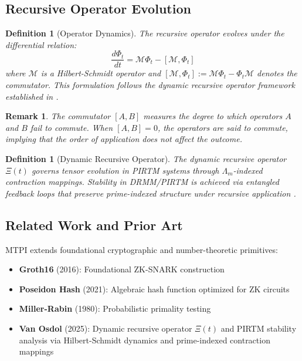 \documentclass[11pt,a4paper]{article}
\newtheorem{definition}[theorem]{Definition}
\newtheorem{remark}[theorem]{Remark}
\newcommand{\Commutator}[2]{[#1, #2]}
\newcommand{\XiOp}{\Xi(t)}
\begin{document}
\subsection{Recursive Operator Evolution}

\begin{definition}[Operator Dynamics]
The recursive operator evolves under the differential relation:
\begin{equation}
    \frac{d\Phi_t}{dt} = \mathcal{M}\Phi_t - \Commutator{\mathcal{M}}{\Phi_t}
    \label{eq:operator_evolution}
\end{equation}
where $\mathcal{M}$ is a Hilbert-Schmidt operator and $\Commutator{\mathcal{M}}{\Phi_t} := \mathcal{M}\Phi_t - \Phi_t\mathcal{M}$ denotes the commutator. This formulation follows the dynamic recursive operator framework established in \cite{vanosdol2025}.
\end{definition}

\begin{remark}
The commutator $\Commutator{A}{B}$ measures the degree to which operators $A$ and $B$ fail to commute. When $\Commutator{A}{B} = 0$, the operators are said to commute, implying that the order of application does not affect the outcome.
\end{remark}

\begin{definition}[Dynamic Recursive Operator]
The dynamic recursive operator $\XiOp$ governs tensor evolution in PIRTM systems through $\Lambda_m$-indexed contraction mappings. Stability in DRMM/PIRTM is achieved via entangled feedback loops that preserve prime-indexed structure under recursive application \cite{vanosdol2025}.
\end{definition}

\subsection{Related Work and Prior Art}

MTPI extends foundational cryptographic and number-theoretic primitives:

\begin{itemize}[noitemsep]
    \item \textbf{Groth16} (2016): Foundational ZK-SNARK construction \cite{groth2016}
    \item \textbf{Poseidon Hash} (2021): Algebraic hash function optimized for ZK circuits \cite{grassi2021}
    \item \textbf{Miller-Rabin} (1980): Probabilistic primality testing \cite{rabin1980}
    \item \textbf{Van Osdol} (2025): Dynamic recursive operator $\XiOp$ and PIRTM stability analysis via Hilbert-Schmidt dynamics and prime-indexed contraction mappings \cite{vanosdol2025}
\end{itemize}
\end{document}
